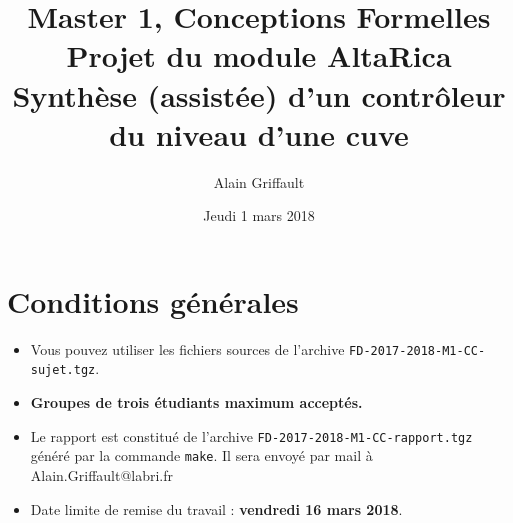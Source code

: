 \documentclass[a4paper]{article}
\newcommand{\altarica}{{\sc AltaRica}}
\begin{document}
\title{Master 1, Conceptions Formelles\\
Projet du module \altarica\\
Synthèse (assistée) d'un contrôleur du niveau d'une cuve}

\date{Jeudi 1 mars 2018}

\author{Alain Griffault}

\maketitle



\section{Conditions générales}

\begin{itemize}
\item Vous pouvez utiliser les fichiers sources de l'archive {\tt FD-2017-2018-M1-CC-sujet.tgz}.
\item {\bf Groupes de trois étudiants maximum acceptés.}
\item Le rapport est constitué de l'archive {\tt FD-2017-2018-M1-CC-rapport.tgz} généré par la commande {\tt make}. Il sera envoyé par mail à Alain.Griffault@labri.fr
\item Date limite de remise du travail : {\bf vendredi 16 mars 2018}.
\end{itemize}
\end{document}
